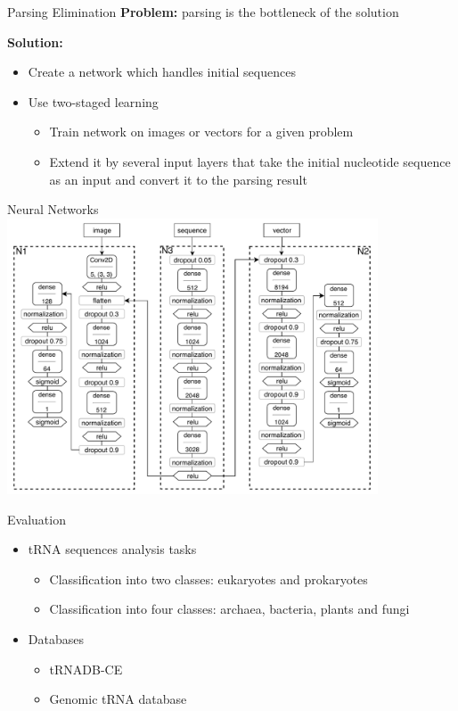 \documentclass[xcolor=table]{beamer}
\begin{document}
\begin{frame}{Parsing Elimination}
\textbf{Problem:} parsing is the bottleneck of the solution
\vspace{8}

\textbf{Solution:}
    \begin{itemize}
        \item Create a network which handles initial sequences
        \item Use two-staged learning
        \begin{itemize}
            \item Train network on images or vectors for a given problem
            \item Extend it by several input layers that take the initial nucleotide sequence as an input and convert it to the parsing result 
        \end{itemize}
    \end{itemize}
\end{frame}

\begin{frame}{Neural Networks}
\includegraphics[width=11cm]{pictures/nn_all.pdf}
\end{frame}


\begin{frame}{Evaluation}
\begin{itemize}
    \item tRNA sequences analysis tasks
    \begin{itemize}
        \item Classification into two classes: eukaryotes and prokaryotes
        \item Classification into four classes: archaea, bacteria, plants and fungi
    \end{itemize}
    \item Databases
    \begin{itemize}
        \item tRNADB-CE
        \item Genomic tRNA database
    \end{itemize}
\end{itemize}
\end{frame}
\end{document}
